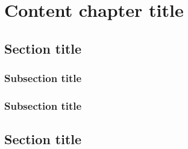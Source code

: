 \chapter{Content chapter title}
\section{Section title}
\subsection{Subsection title}
\subsection{Subsection title}
\section{Section title}